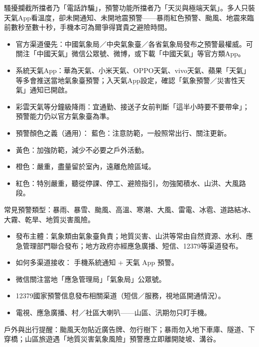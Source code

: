 
騷擾攔截所擋者乃「電話詐騙」，預警功能所擋者乃「天災與極端天氣」。多人只裝天氣App看溫度，卻未開通知、未開地震預警——暴雨紅色預警、颱風、地震來臨前數秒至數十秒，手機本可為爾爭得寶貴之避險時間。


\begin{itemize}
  \item 官方渠道優先：中國氣象局／中央氣象臺／各省氣象局發布之預警最權威。可關注「中國天氣」微信公眾號、微博，或下載「中國天氣」等官方類App。
  \item 系統天氣App：華為天氣、小米天氣、OPPO天氣、vivo天氣、蘋果「天氣」等多會推送當地氣象臺預警；入天氣App設定，確認「氣象預警／災害性天氣」通知已開啟。
  \item 彩雲天氣等分鐘級降雨：宜通勤、接送子女前判斷「這半小時要不要帶傘」；預警能力仍以官方氣象臺為準。
  \item 預警顏色之義（通用）： 藍色：注意防範，一般照常出行、關注更新。
  \item 黃色：加強防範，減少不必要之戶外活動。
  \item 橙色：嚴重，盡量留於室內，遠離危險區域。
  \item 紅色：特別嚴重，聽從停課、停工、避險指引，勿強闖積水、山洪、大風路段。
\end{itemize}

常見預警類型：暴雨、暴雪、颱風、高溫、寒潮、大風、雷電、冰雹、道路結冰、大霧、乾旱、地質災害風險。


\begin{itemize}
  \item 發布主體：氣象類由氣象臺負責；地質災害、山洪等常由自然資源、水利、應急管理部門聯合發布；地方政府亦經應急廣播、短信、12379等渠道發布。
  \item 如何多渠道接收： 手機系統通知 + 天氣 App 預警。
  \item 微信關注當地「應急管理局」「氣象局」公眾號。
  \item 12379國家預警信息發布相關渠道（短信／服務，視地區開通情況）。
  \item 電視、應急廣播、村／社區大喇叭——山區、汛期勿只盯手機。
\end{itemize}

戶外與出行提醒：颱風天勿貼近廣告牌、勿行樹下；暴雨勿入地下車庫、隧道、下穿橋；山區旅遊遇「地質災害氣象風險」預警應立即離開陡坡、溝谷。

